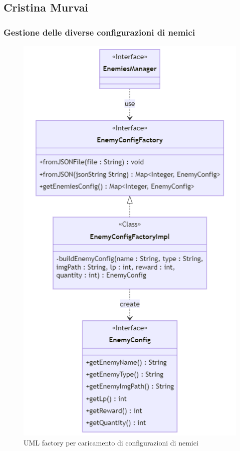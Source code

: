 \documentclass[a4paper,12pt]{report}
\begin{document}
\subsection{Cristina Murvai}
\subsubsection{Gestione delle diverse configurazioni di nemici}

\begin{figure}[H]
    \centering
    \includegraphics[scale=0.8]{RelazioneTD/images/enemyConfigFactoryUML.png}
    \caption{UML factory per caricamento di configurazioni di nemici}
    \label{fig:enter-label}
\end{figure}
\end{document}
